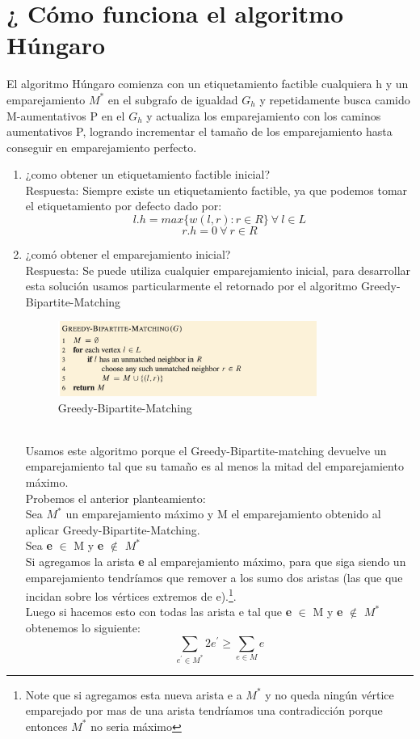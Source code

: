 \documentclass[sn-mathphys,Numbered]{sn-jnl}%
\theoremstyle{thmstyleone}%
\theoremstyle{thmstyletwo}%
\theoremstyle{thmstylethree}%
\begin{document}
\section{¿ C\'omo funciona el algoritmo Húngaro }
El algoritmo Húngaro comienza con un etiquetamiento factible cualquiera h y un emparejamiento $M^*$ en el subgrafo de igualdad $G_h$ y repetidamente busca camido M-aumentativos P en el $G_h$ y actualiza los emparejamiento con los caminos aumentativos P, logrando incrementar el tama\~no de los emparejamiento hasta conseguir en emparejamiento perfecto.
\begin{enumerate}
    \item ¿como obtener un etiquetamiento factible inicial?\\
    Respuesta: Siempre existe un etiquetamiento factible, ya que podemos tomar el etiquetamiento por defecto dado por:
    $$l.h = max \{ w(l,r) : r \in R\} ~ \forall ~l \in L$$
    $$r.h = 0 ~\forall ~r \in R$$
    \item ¿com\'o obtener el emparejamiento inicial? \\
    Respuesta: Se puede utiliza cualquier emparejamiento inicial, para desarrollar esta solución usamos particularmente el retornado por el algoritmo Greedy-Bipartite-Matching\cite{3}
    \begin{figure}[htb]
        \centering
        \includegraphics[width=0.8\textwidth]{Screenshot 2023-04-01 at 11.32.25 PM.png}
        \centering
        \caption{Greedy-Bipartite-Matching\cite{3}}
    \end{figure}\\
    Usamos este algoritmo porque el Greedy-Bipartite-matching devuelve un emparejamiento tal que su tamaño es al menos la mitad del emparejamiento m\'aximo.\\
    Probemos el anterior planteamiento: \\
    Sea $M^*$ un emparejamiento máximo y M el emparejamiento obtenido al aplicar Greedy-Bipartite-Matching.\\
    Sea \textbf{e} $\in$ M y \textbf{e} $\notin$ $M^*$\\
    Si agregamos la arista \textbf{e} al emparejamiento máximo, para que siga siendo un emparejamiento tendríamos que remover a los sumo dos aristas (las que que incidan sobre los vértices extremos de e).\footnote{Note que si agregamos esta nueva arista e a $M^*$ y no queda ningún vértice emparejado por mas de una arista tendríamos una contradicción porque entonces $M^*$ no seria máximo}.\\
    Luego si hacemos esto con todas las arista e tal que \textbf{e} $\in$ M y \textbf{e} $\notin$ $M^*$ obtenemos lo siguiente:\\
    \[
    \sum_{e^{'}\in M^*} 2e^{'} \geq \sum_{e\in M} e
    \]
    

\end{enumerate}
\end{document}
